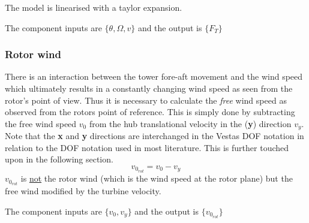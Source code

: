 The model is linearised with a taylor expansion.

The component inputs are $ \{\theta, \Omega, v \} $ and the output is $ \{F_T\} $


\subsubsection{Rotor wind} \label{sec:comp_rot_wind}
There is an interaction between the tower fore-aft movement and the wind speed which ultimately results in a constantly changing wind speed as seen from the rotor's point of view. Thus it is necessary to calculate the \textit{free} wind speed as observed from the rotors point of reference. This is simply done by subtracting the free wind speed $ v_0 $ from the hub translational velocity in the  (\textbf{y}) direction $ v_y $. Note that the \textbf{x} and \textbf{y} directions are interchanged in the Vestas DOF notation in relation to the DOF notation used in most literature. This is further touched upon in the following section. 
\begin{equation}\label{eq:comp_rotorwind}
	v_{0_{rot}} = v_{0} - v_y
\end{equation}
$ v_{0_{rot}} $ is \underline{not} the rotor wind (which is the wind speed at the rotor plane) but the free wind modified by the turbine velocity.

The component inputs are $ \{v_0, v_y\} $ and the output is $ \{v_{0_{rot}}\} $


